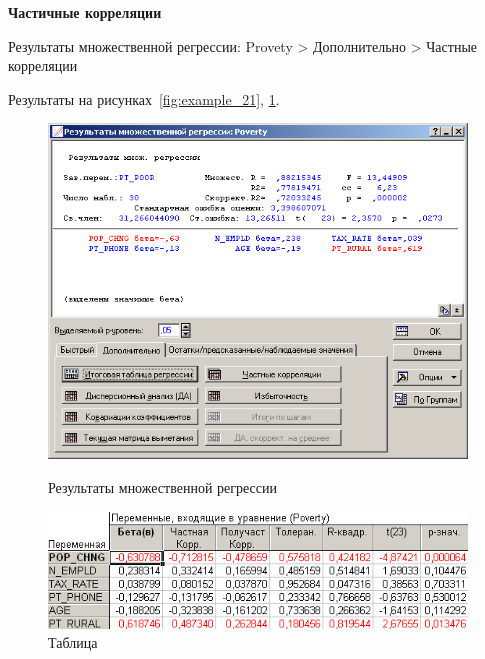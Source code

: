 \begin{center}
  \textbf{Частичные корреляции}
\end{center}

Результаты множественной регрессии: Provety > Дополнительно > Частные корреляции

Результаты на рисунках~\ref{fig:example_21}, \ref{fig:example_22}.

\begin{figure}[!h]
  \centering
  \begin{minipage}{0.49\textwidth}
    \centering

    \includegraphics[width=0.99\textwidth]
    {inc/example_21.PNG}

    \caption{Результаты множественной регрессии}
    \label{fig:example_21}
  \end{minipage}
  \begin{minipage}{0.49\textwidth}
    \centering

    \includegraphics[width=0.99\textwidth]
    {inc/example_22.PNG}

    \caption{Таблица}
    \label{fig:example_22}
  \end{minipage}
\end{figure}

